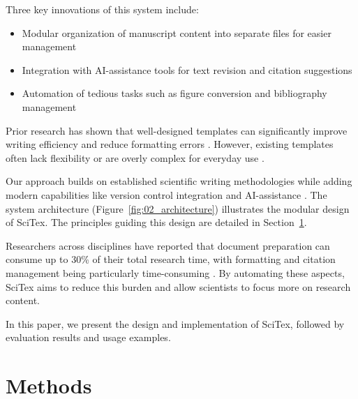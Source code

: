 \documentclass[preprint,review,12pt]{elsarticle}%
\begin{document}
\begin{frontmatter}
Three key innovations of this system include:

\begin{itemize}
    \item Modular organization of manuscript content into separate files for easier management
    \item Integration with AI-assistance tools for text revision and citation suggestions
    \item Automation of tedious tasks such as figure conversion and bibliography management
\end{itemize}

Prior research has shown that well-designed templates can significantly improve writing efficiency and reduce formatting errors \cite{Williams2021}. However, existing templates often lack flexibility or are overly complex for everyday use \cite{Garcia2019}.

Our approach builds on established scientific writing methodologies while adding modern capabilities like version control integration and AI-assistance \cite{Taylor2022}. The system architecture (Figure~\ref{fig:02_architecture}) illustrates the modular design of SciTex. The principles guiding this design are detailed in Section~\ref{sec:methods}.


Researchers across disciplines have reported that document preparation can consume up to 30\% of their total research time, with formatting and citation management being particularly time-consuming \cite{Lee2018}. By automating these aspects, SciTex aims to reduce this burden and allow scientists to focus more on research content.

In this paper, we present the design and implementation of SciTex, followed by evaluation results and usage examples.


\section{Methods}
\label{sec:methods}


\end{frontmatter}
\end{document}
